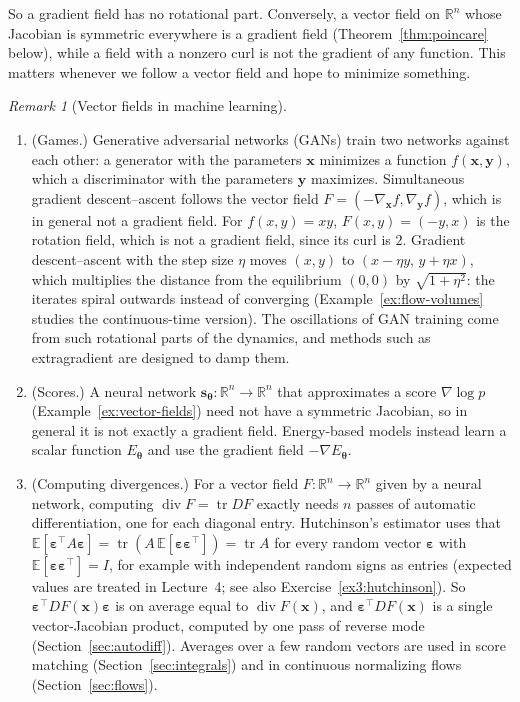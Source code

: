 \documentclass[11pt]{article}
\theoremstyle{definition}
\theoremstyle{plain}
\theoremstyle{remark}
\newtheorem{remark}[definition]{Remark}
\DeclareMathOperator{\tr}{tr}
\DeclareMathOperator{\Div}{div}
\begin{document}
So a gradient field has no rotational part. Conversely, a vector field on $\mathbb{R}^n$ whose Jacobian is symmetric everywhere is a gradient field (Theorem~\ref{thm:poincare} below), while a field with a nonzero curl is not the gradient of any function. This matters whenever we follow a vector field and hope to minimize something.

\begin{remark}[Vector fields in machine learning]\label{rem:vector-fields-ml}
    \begin{enumerate}
        \item (Games.) Generative adversarial networks (GANs) train two networks against each other: a generator with the parameters $\mathbf{x}$ minimizes a function $f(\mathbf{x}, \mathbf{y})$, which a discriminator with the parameters $\mathbf{y}$ maximizes. Simultaneous gradient descent--ascent follows the vector field $F = (-\nabla_{\mathbf{x}}f, \nabla_{\mathbf{y}}f)$, which is in general not a gradient field. For $f(x, y) = xy$, $F(x, y) = (-y, x)$ is the rotation field, which is not a gradient field, since its curl is $2$. Gradient descent--ascent with the step size $\eta$ moves $(x, y)$ to $(x - \eta y, \, y + \eta x)$, which multiplies the distance from the equilibrium $(0, 0)$ by $\sqrt{1 + \eta^2}$: the iterates spiral outwards instead of converging (Example~\ref{ex:flow-volumes} studies the continuous-time version). The oscillations of GAN training come from such rotational parts of the dynamics, and methods such as extragradient are designed to damp them.
        \item (Scores.) A neural network $\mathbf{s}_{\boldsymbol{\theta}}: \mathbb{R}^n \to \mathbb{R}^n$ that approximates a score $\nabla\log p$ (Example~\ref{ex:vector-fields}) need not have a symmetric Jacobian, so in general it is not exactly a gradient field. Energy-based models instead learn a scalar function $E_{\boldsymbol{\theta}}$ and use the gradient field $-\nabla E_{\boldsymbol{\theta}}$.
        \item (Computing divergences.) For a vector field $F: \mathbb{R}^n \to \mathbb{R}^n$ given by a neural network, computing $\Div F = \tr DF$ exactly needs $n$ passes of automatic differentiation, one for each diagonal entry. Hutchinson's estimator uses that $\mathbb{E}[\boldsymbol{\varepsilon}^\top A\boldsymbol{\varepsilon}] = \tr(A\,\mathbb{E}[\boldsymbol{\varepsilon}\boldsymbol{\varepsilon}^\top]) = \tr A$ for every random vector $\boldsymbol{\varepsilon}$ with $\mathbb{E}[\boldsymbol{\varepsilon}\boldsymbol{\varepsilon}^\top] = I$, for example with independent random signs as entries (expected values are treated in Lecture~4; see also Exercise~\ref{ex3:hutchinson}). So $\boldsymbol{\varepsilon}^\top DF(\mathbf{x})\boldsymbol{\varepsilon}$ is on average equal to $\Div F(\mathbf{x})$, and $\boldsymbol{\varepsilon}^\top DF(\mathbf{x})$ is a single vector-Jacobian product, computed by one pass of reverse mode (Section~\ref{sec:autodiff}). Averages over a few random vectors are used in score matching (Section~\ref{sec:integrals}) and in continuous normalizing flows (Section~\ref{sec:flows}).
    \end{enumerate}
\end{remark}
\end{document}
